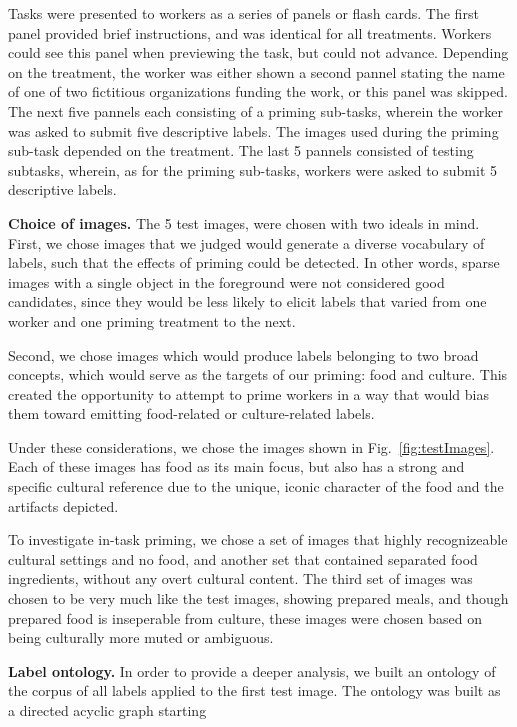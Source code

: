 \documentclass[letterpaper, 11pt, twocolumn]{article}
\begin{document}
Tasks were presented to workers as a series of panels or flash cards.  The
first panel provided brief instructions, and was identical for all treatments.
Workers could see this panel when previewing the task, but could not advance.
Depending on the treatment, the worker was either shown a second pannel 
stating the name of 
one of two fictitious organizations funding the work, or this panel was 
skipped.  The next five pannels each consisting of a priming sub-tasks, 
wherein the worker was asked to submit five descriptive labels.  The images
used during the priming sub-task depended on the treatment.  The last 5 pannels
consisted of testing subtasks, wherein, as for the priming sub-tasks, workers
were asked to submit 5 descriptive labels.

\textbf{Choice of images.}
The 5 test images, were chosen with two ideals in mind.  
First, we chose images that we judged would generate a diverse vocabulary of 
labels, such that the effects of priming could be detected.  In other words,
sparse images with a single object in the foreground were not considered good 
candidates, since they would be less likely to elicit labels that varied from 
one worker and one priming treatment to the next.

Second, we chose images which would produce labels belonging to two broad
concepts, which would serve as the targets of our priming: food and culture.  
This created the opportunity to attempt to prime workers in a way that would
bias them toward emitting food-related or culture-related labels.

Under these considerations, we chose the images shown in 
Fig.~\ref{fig:testImages}.  Each of these images has food as its main focus,
but also has a strong and specific cultural reference due to the unique, 
iconic character of the food and the artifacts depicted.

To investigate in-task priming, we chose a set of images that highly
recognizeable cultural settings and no food, and another set that contained
separated food ingredients, without any overt cultural content.  The third
set of images was chosen to be very much like the test images, showing prepared
meals, and though prepared food is inseperable from culture, these images
were chosen based on being culturally more muted or ambiguous. 

\textbf{Label ontology.}
In order to provide a deeper analysis, we built an ontology
of the corpus of all labels applied to the first test image.  The ontology
was built as a directed acyclic graph starting 
\end{document}
